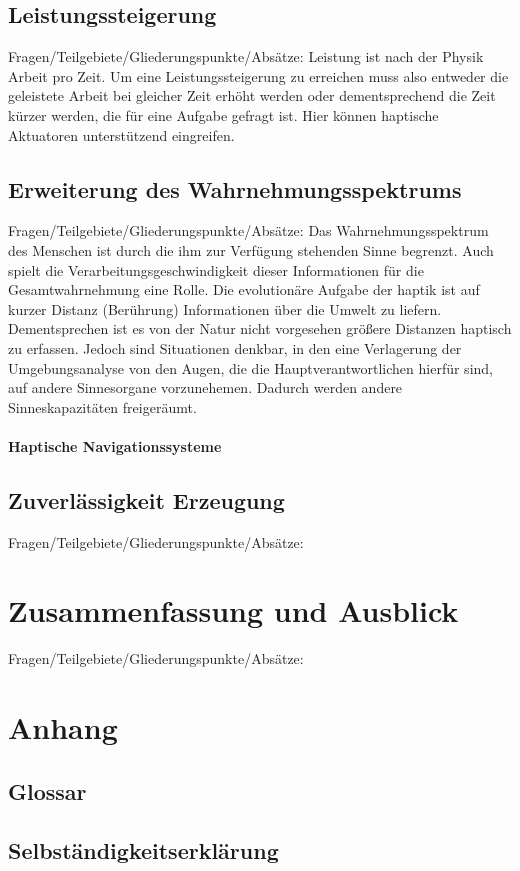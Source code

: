 \documentclass{llncs}					%
\begin{document}
\subsection{Leistungssteigerung}
Fragen/Teilgebiete/Gliederungspunkte/Absätze:
Leistung ist nach der Physik Arbeit pro Zeit. Um eine Leistungssteigerung zu erreichen muss also entweder die geleistete Arbeit bei gleicher Zeit erhöht werden oder dementsprechend die Zeit kürzer werden, die für eine Aufgabe gefragt ist.
Hier können haptische Aktuatoren unterstützend eingreifen.


\subsection{Erweiterung des Wahrnehmungsspektrums}
Fragen/Teilgebiete/Gliederungspunkte/Absätze:
Das Wahrnehmungsspektrum des Menschen ist durch die ihm zur Verfügung stehenden Sinne begrenzt. Auch spielt die Verarbeitungsgeschwindigkeit dieser Informationen für die Gesamtwahrnehmung eine Rolle.
Die evolutionäre Aufgabe der haptik ist auf kurzer Distanz (Berührung) Informationen über die Umwelt zu liefern. Dementsprechen ist es von der Natur nicht vorgesehen größere Distanzen haptisch zu erfassen.
Jedoch sind Situationen denkbar, in den eine Verlagerung der Umgebungsanalyse von den Augen, die die Hauptverantwortlichen hierfür sind, auf andere Sinnesorgane vorzunehemen. Dadurch werden andere Sinneskapazitäten freigeräumt.

\paragraph{Haptische Navigationssysteme}

\subsection{Zuverlässigkeit Erzeugung}
Fragen/Teilgebiete/Gliederungspunkte/Absätze:

\section{Zusammenfassung und Ausblick}
Fragen/Teilgebiete/Gliederungspunkte/Absätze:

\section{Anhang}

\clearpage
\subsection{Glossar}\label{glossar}

\renewcommand*{\glossarysection}[2][]{}	%
\printnoidxglossaries				%

\subsection{Selbständigkeitserklärung}

\clearpage

\end{document}
